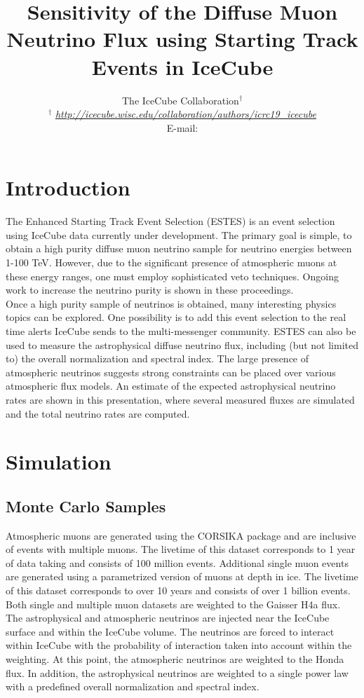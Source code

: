 \documentclass{PoS}
\title{Sensitivity of the Diffuse Muon Neutrino Flux using Starting Track Events in IceCube}
\author{
The IceCube Collaboration$^{\dagger}$\\
{$^{\dagger}$ \itshape \href{http://icecube.wisc.edu/collaboration/authors/icrc19_icecube}{http://icecube.wisc.edu/collaboration/authors/icrc19\_icecube}}\\
E-mail: \email{msilva@icecube.wisc.edu, smancina@icecube.wisc.edu}
}
\begin{document}

\section{Introduction}\label{sec:info}
The Enhanced Starting Track Event Selection (ESTES) is an event selection using IceCube data currently under development. The primary goal is simple, to obtain a high purity diffuse muon neutrino sample for neutrino energies between 1-100 TeV. However, due to the significant presence of atmospheric muons at these energy ranges, one must employ sophisticated veto techniques. Ongoing work to increase the neutrino purity is shown in these proceedings. \\
Once a high purity sample of neutrinos is obtained, many interesting physics topics can be explored. One possibility is to add this event selection to the real time alerts IceCube sends to the multi-messenger community\cite{ESTESv1:2019icrc_ESTESv1}. ESTES can also be used to measure the astrophysical diffuse neutrino flux, including (but not limited to) the overall normalization and spectral index. The large presence of atmospheric neutrinos suggests strong constraints can be placed over various atmospheric flux models. An estimate of the expected astrophysical neutrino rates are shown in this presentation, where several measured fluxes are simulated and the total neutrino rates are computed.


\section{Simulation}\label{sec:sim}

\subsection{Monte Carlo Samples}\label{sec:MC}
Atmospheric muons are generated using the CORSIKA package and are inclusive of events with multiple muons. The livetime of this dataset corresponds to 1 year of data taking and consists of 100 million events. Additional single muon events are generated using a parametrized version of muons at depth in ice. The livetime of this dataset corresponds to over 10 years and consists of over 1 billion events. Both single and multiple muon datasets are weighted to the Gaisser H4a flux.\\
The astrophysical and atmospheric neutrinos are injected near the IceCube surface and within the IceCube volume. The neutrinos are forced to interact within IceCube with the probability of interaction taken into account within the weighting. At this point, the atmospheric neutrinos are weighted to the Honda flux\cite{Atmos:Honda}. In addition, the astrophysical neutrinos are weighted to a single power law with a predefined overall normalization and spectral index.
\end{document}
